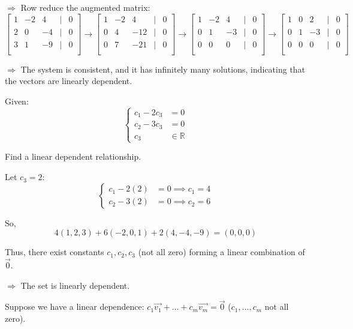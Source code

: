 \documentclass{article}
\begin{document}
$\Rightarrow$ Row reduce the augmented matrix:
\[
\begin{bmatrix}
    1 & -2 & 4 & | & 0 \\
    2 & 0 & -4 & | & 0 \\
    3 & 1 & -9 & | & 0 \\
\end{bmatrix}
\rightarrow
\begin{bmatrix}
    1 & -2 & 4 & | & 0 \\
    0 & 4 & -12 & | & 0 \\
    0 & 7 & -21 & | & 0 \\
\end{bmatrix}
\rightarrow
\begin{bmatrix}
    1 & -2 & 4 & | & 0 \\
    0 & 1 & -3 & | & 0 \\
    0 & 0 & 0 & | & 0 \\
\end{bmatrix}
\rightarrow
\begin{bmatrix}
    1 & 0 & 2 & | & 0 \\
    0 & 1 & -3 & | & 0 \\
    0 & 0 & 0 & | & 0 \\
\end{bmatrix}
\]

$\Rightarrow$ The system is consistent, and it has infinitely many solutions, indicating that the vectors are linearly dependent.



Given:
\[
\begin{cases}
    c_1 - 2c_3 &= 0 \\
    c_2 - 3c_3 &= 0 \\
    c_3 &\in \mathbb{R}
\end{cases}
\]

Find a linear dependent relationship.

Let \(c_3 = 2\):
\[
\begin{cases}
    c_1 - 2(2) &= 0 \implies c_1 = 4 \\
    c_2 - 3(2) &= 0 \implies c_2 = 6
\end{cases}
\]

So, \[4(1,2,3) + 6(-2,0,1) + 2(4,-4,-9) = (0,0,0)\]

Thus, there exist constants \(c_1, c_2, c_3\) (not all zero) forming a linear combination of \(\vec{0}\).

\(\Rightarrow\) The set is linearly dependent.

Suppose we have a linear dependence: \(c_1\vec{v_1} + \ldots + c_m\vec{v_m} = \vec{0}\) (\(c_1, \ldots, c_m\) not all zero).
\end{document}
